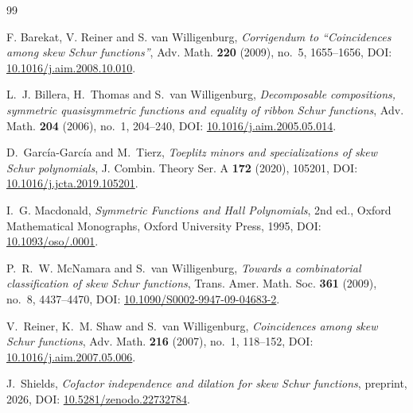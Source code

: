 \documentclass[11pt,a4paper]{amsart}
\numberwithin{equation}{section}
\theoremstyle{plain}
\theoremstyle{definition}
\begin{document}
\begin{thebibliography}{99}

F. Barekat, V. Reiner and S. van Willigenburg,
\emph{Corrigendum to ``Coincidences among skew Schur functions''},
Adv. Math. \textbf{220} (2009), no.~5, 1655--1656,
DOI: \href{https://doi.org/10.1016/j.aim.2008.10.010}{10.1016/\allowbreak j.aim.2008.10.010}.

L.~J. Billera, H.~Thomas and S.~van Willigenburg,
\emph{Decomposable compositions, symmetric quasisymmetric functions and equality of ribbon Schur functions},
Adv. Math. \textbf{204} (2006), no.~1, 204--240,
DOI: \href{https://doi.org/10.1016/j.aim.2005.05.014}{10.1016/\allowbreak j.aim.2005.05.014}.

D.~Garc\'ia-Garc\'ia and M.~Tierz,
\emph{Toeplitz minors and specializations of skew Schur polynomials},
J. Combin. Theory Ser. A \textbf{172} (2020), 105201,
DOI: \href{https://doi.org/10.1016/j.jcta.2019.105201}{10.1016/\allowbreak j.jcta.2019.105201}.

I.~G. Macdonald,
\emph{Symmetric Functions and Hall Polynomials}, 2nd ed.,
Oxford Mathematical Monographs, Oxford University Press, 1995,
DOI: \href{https://doi.org/10.1093/oso/9780198534891.001.0001}{10.1093/\allowbreak oso/.0001}.

P.~R.~W. McNamara and S.~van Willigenburg,
\emph{Towards a combinatorial classification of skew Schur functions},
Trans. Amer. Math. Soc. \textbf{361} (2009), no.~8, 4437--4470,
DOI: \href{https://doi.org/10.1090/S0002-9947-09-04683-2}{10.1090/\allowbreak S0002-9947-09-04683-2}.

V.~Reiner, K.~M. Shaw and S.~van Willigenburg,
\emph{Coincidences among skew Schur functions},
Adv. Math. \textbf{216} (2007), no.~1, 118--152,
DOI: \href{https://doi.org/10.1016/j.aim.2007.05.006}{10.1016/\allowbreak j.aim.2007.05.006}.

J.~Shields,
\emph{Cofactor independence and dilation for skew Schur functions},
preprint, 2026,
DOI: \href{https://doi.org/10.5281/zenodo.22732784}{10.5281/\allowbreak zenodo.22732784}.


\end{thebibliography}
\end{document}
